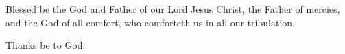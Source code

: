 Blessed be the God and Father of our Lord Jesus Christ, the Father of mercies, and the God of all comfort, who comforteth us in all our tribulation.

\rr Thanks be to God.